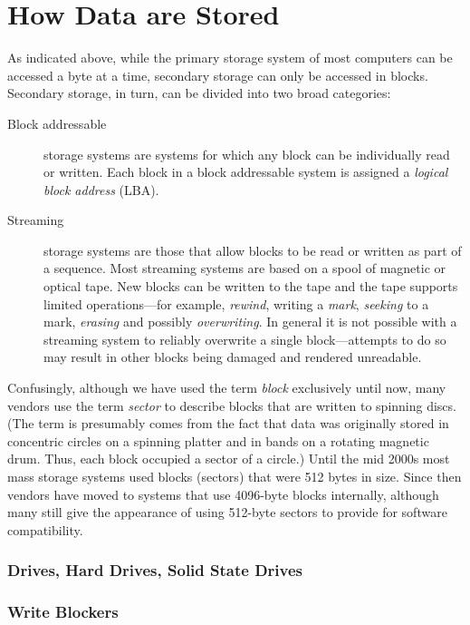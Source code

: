 \chapter{How Data are Stored}
As indicated above, while the primary storage system of most computers can be accessed a
byte at a time, secondary storage can only be accessed in
blocks. Secondary storage, in turn, can be divided into two broad
categories:

\begin{description}
\item[Block addressable] storage systems are systems for which any
  block can be individually read or written. Each block in a block
  addressable system is assigned a \emph{logical block address}
  (LBA). 
\item[Streaming] storage systems are those that allow blocks to be
  read or written as part of a sequence. Most streaming systems are
  based on a spool of magnetic or optical tape. New blocks can be
  written to the tape and the tape supports limited operations---for
  example, \emph{rewind}, writing a \emph{mark}, \emph{seeking} to a mark,
   \emph{erasing} and possibly \emph{overwriting}. In general it is
   not possible with a streaming system to reliably overwrite a single
   block---attempts to do so may result in other blocks being damaged
   and rendered unreadable.
\end{description}

Confusingly, although we have used the term \emph{block} exclusively
until now, many vendors use the term \emph{sector} to describe blocks
that are written to spinning discs. (The term is presumably comes from
the fact that data was originally stored in concentric circles on a spinning platter
and in bands on a rotating magnetic drum. Thus, each block occupied a
sector of a circle.) Until the mid 2000s most mass storage systems
used blocks (sectors) that were 512 bytes in size. Since then vendors
have moved to systems that use 4096-byte blocks internally, although
many still give the appearance of using 512-byte sectors to provide
for software compatibility. 

\subsection{Drives, Hard Drives, Solid State Drives}

\subsection{Write Blockers}

